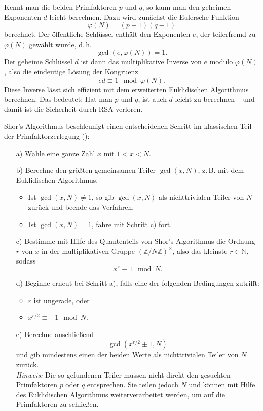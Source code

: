 Kennt man die beiden Primfaktoren \( p \) und \( q \), so kann man den geheimen Exponenten \( d \) leicht berechnen. Dazu wird zunächst die Eulersche Funktion 
\[
\varphi(N) = (p - 1)(q - 1)
\]
berechnet. Der öffentliche Schlüssel enthält den Exponenten \( e \), der teilerfremd zu \( \varphi(N) \) gewählt wurde, d.\,h.
\[
\gcd(e, \varphi(N)) = 1.
\]
Der geheime Schlüssel \( d \) ist dann das multiplikative Inverse von \( e \) modulo \( \varphi(N) \), also die eindeutige Lösung der Kongruenz
\[
ed \equiv 1 \mod \varphi(N).
\]
Diese Inverse lässt sich effizient mit dem erweiterten Euklidischen Algorithmus berechnen. Das bedeutet: Hat man \( p \) und \( q \), ist auch \( d \) leicht zu berechnen – und damit ist die Sicherheit durch RSA verloren.

Shor's Algorithmus beschleunigt einen entscheidenen Schritt im klassischen Teil der Primfaktorzerlegung (\cite{shor_polynomial-time_1994}):

\begin{itemize}
  \item[a)] Wähle eine ganze Zahl \(x\) mit \(1 < x < N\).
  
  \item[b)] Berechne den größten gemeinsamen Teiler \(\gcd(x, N)\), z.\,B. mit dem Euklidischen Algorithmus.  
  \begin{itemize}
    \item Ist \(\gcd(x, N) \ne 1\), so gib \(\gcd(x, N)\) als nichttrivialen Teiler von \(N\) zurück und beende das Verfahren.
    \item Ist \(\gcd(x, N) = 1\), fahre mit Schritt c) fort.
  \end{itemize}
  
  \item[c)] Bestimme mit Hilfe des Quantenteils von Shor's Algorithmus die Ordnung \(r\) von \(x\) in der multiplikativen Gruppe \((\mathbb{Z}/N\mathbb{Z})^\times\), also das kleinste \(r \in \mathbb{N}\), sodass
  \[
  x^r \equiv 1 \mod N.
  \]
  
  \item[d)] Beginne erneut bei Schritt a), falls eine der folgenden Bedingungen zutrifft:
  \begin{itemize}
    \item \(r\) ist ungerade, oder
    \item \(x^{r/2} \equiv -1 \mod N\).
  \end{itemize}
  
  \item[e)] Berechne anschließend
  \[
  \gcd(x^{r/2} \pm 1, N)
  \]
  und gib mindestens einen der beiden Werte als nichttrivialen Teiler von \(N\) zurück.\\
  \[
  \]
  \textit{Hinweis:} Die so gefundenen Teiler müssen nicht direkt den gesuchten Primfaktoren \(p\) oder \(q\) entsprechen. Sie teilen jedoch \(N\) und können mit Hilfe des Euklidischen Algorithmus weiterverarbeitet werden, um auf die Primfaktoren zu schließen.
\end{itemize}


